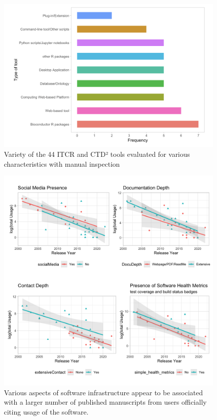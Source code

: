 \documentclass{article}
\begin{document}
\begin{figure}[!ht] 
    \centering
\includegraphics[width=\textwidth,height=\textheight,keepaspectratio]{images/tool_diversity.png}
    \caption{Variety of the 44 ITCR and CTD² tools evaluated for various characteristics with manual inspection}
    \label{fig:tool_eval}
\end{figure}



\begin{figure}[!ht]
    \centering
\includegraphics[width=\textwidth,height=\textheight,keepaspectratio]{images/inf_cit.png}
    \caption{Various aspects of software infrastructure appear to be associated with a larger number of published manuscripts from users officially citing usage of the software.}
    \label{fig:inf_cit}
\end{figure}
\end{document}
